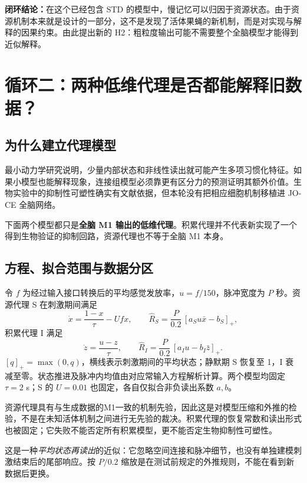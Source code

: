 \documentclass[UTF8,a4paper,zihao=-4,fontset=none]{ctexart}
\begin{document}
\textbf{闭环结论：}在这个已经包含 STD 的模型中，慢记忆可以归因于资源状态。由于资源机制本来就是设计的一部分，这不是发现了活体果蝇的新机制，而是对实现与解释的因果约束。由此提出新的 H2：粗粒度输出可能不需要整个全脑模型才能得到近似解释。

\section{循环二：两种低维代理是否都能解释旧数据？}
\subsection{为什么建立代理模型}
最小动力学研究说明，少量内部状态和非线性读出就可能产生多项习惯化特征\citep{smart2024}。如果小模型也能解释现象，连接组模型必须靠更有区分力的预测证明其额外价值。生物实验中的抑制性可塑性确实有文献依据\citep{das2011,paranjpe2012,trisal2022}，但本轮没有把相应细胞机制移植进 JO-CE 全脑网络。

下面两个模型都只是\textbf{全脑 M1 输出的低维代理}。积累代理并不代表新实现了一个得到生物验证的抑制回路，资源代理也不等于全脑 M1 本身。

\subsection{方程、拟合范围与数据分区}
令 $f$ 为经过输入接口转换后的平均感觉发放率，$u=f/150$，脉冲宽度为 $P$ 秒。资源代理 S 在刺激期间满足
\begin{equation}
\dot{x}=\frac{1-x}{\tau}-Ufx,
\qquad \widehat R_S=\frac{P}{0.2}\,[a_Su\bar{x}-b_S]_+,
\label{eq:surrogateS}
\end{equation}
积累代理 I 满足
\begin{equation}
\dot{z}=\frac{u-z}{\tau},
\qquad \widehat R_I=\frac{P}{0.2}\,[a_Iu-b_I\bar{z}]_+.
\label{eq:surrogateI}
\end{equation}
$[q]_+=\max(0,q)$，横线表示刺激期间的平均状态；静默期 S 恢复至 1，I 衰减至零。状态推进及脉冲内均值由对应常输入方程解析计算。两个模型均固定 $\tau=2$ s；S 的 $U=0.01$ 也固定，各自仅拟合非负读出系数 $a,b$。

资源代理具有与生成数据的M1一致的机制先验，因此这是对模型压缩和外推的检验，不是在未知活体机制之间进行无先验的裁决。积累代理的恢复常数和读出形式也被固定；它失败不能否定所有积累模型，更不能否定生物抑制性可塑性。

这是一种\emph{平均状态再读出}的近似：它忽略空间连接和脉冲细节，也没有单独建模刺激结束后的尾部响应。按 $P/0.2$ 缩放是在测试前规定的外推规则，不能在看到新数据后更换。
\end{document}
